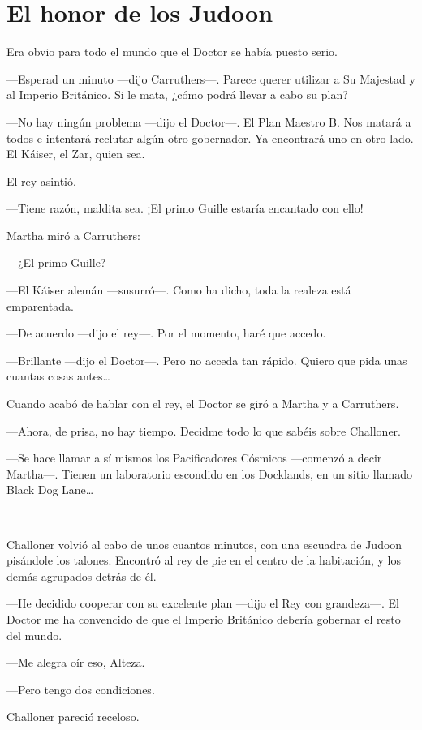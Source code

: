 \chapter*{El honor de los Judoon}

Era obvio para todo el mundo que el Doctor se había puesto serio.

---Esperad un minuto ---dijo Carruthers---. Parece querer utilizar a Su
Majestad y al Imperio Británico. Si le mata, ¿cómo podrá llevar a cabo
su plan?

---No hay ningún problema ---dijo el Doctor---. El Plan Maestro B. Nos
matará a todos e intentará reclutar algún otro gobernador. Ya encontrará
uno en otro lado. El Káiser, el Zar, quien sea.

El rey asintió.

---Tiene razón, maldita sea. ¡El primo Guille estaría encantado con
ello!

Martha miró a Carruthers:

---¿El primo Guille?

---El Káiser alemán ---susurró---. Como ha dicho, toda la realeza está
emparentada.

---De acuerdo ---dijo el rey---. Por el momento, haré que accedo.

---Brillante ---dijo el Doctor---. Pero no acceda tan rápido. Quiero que
pida unas cuantas cosas antes\ldots{}

Cuando acabó de hablar con el rey, el Doctor se giró a Martha y a
Carruthers.

---Ahora, de prisa, no hay tiempo. Decidme todo lo que sabéis sobre
Challoner.

---Se hace llamar a sí mismos los Pacificadores Cósmicos ---comenzó a
decir Martha---. Tienen un laboratorio escondido en los Docklands, en un
sitio llamado Black Dog Lane\ldots{}

~

Challoner volvió al cabo de unos cuantos minutos, con una escuadra de
Judoon pisándole los talones. Encontró al rey de pie en el centro de la
habitación, y los demás agrupados detrás de él.

---He decidido cooperar con su excelente plan ---dijo el Rey con
grandeza---. El Doctor me ha convencido de que el Imperio Británico
debería gobernar el resto del mundo.

---Me alegra oír eso, Alteza.

---Pero tengo dos condiciones.

Challoner pareció receloso.

